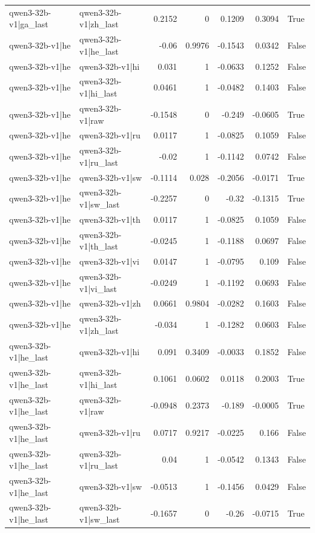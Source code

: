 \begin{table}
\begin{tabular}{l l r r r r l}
qwen3-32b-v1|ga_last & qwen3-32b-v1|zh_last & 0.2152 & 0 & 0.1209 & 0.3094 & True \\
qwen3-32b-v1|he & qwen3-32b-v1|he_last & -0.06 & 0.9976 & -0.1543 & 0.0342 & False \\
qwen3-32b-v1|he & qwen3-32b-v1|hi & 0.031 & 1 & -0.0633 & 0.1252 & False \\
qwen3-32b-v1|he & qwen3-32b-v1|hi_last & 0.0461 & 1 & -0.0482 & 0.1403 & False \\
qwen3-32b-v1|he & qwen3-32b-v1|raw & -0.1548 & 0 & -0.249 & -0.0605 & True \\
qwen3-32b-v1|he & qwen3-32b-v1|ru & 0.0117 & 1 & -0.0825 & 0.1059 & False \\
qwen3-32b-v1|he & qwen3-32b-v1|ru_last & -0.02 & 1 & -0.1142 & 0.0742 & False \\
qwen3-32b-v1|he & qwen3-32b-v1|sw & -0.1114 & 0.028 & -0.2056 & -0.0171 & True \\
qwen3-32b-v1|he & qwen3-32b-v1|sw_last & -0.2257 & 0 & -0.32 & -0.1315 & True \\
qwen3-32b-v1|he & qwen3-32b-v1|th & 0.0117 & 1 & -0.0825 & 0.1059 & False \\
qwen3-32b-v1|he & qwen3-32b-v1|th_last & -0.0245 & 1 & -0.1188 & 0.0697 & False \\
qwen3-32b-v1|he & qwen3-32b-v1|vi & 0.0147 & 1 & -0.0795 & 0.109 & False \\
qwen3-32b-v1|he & qwen3-32b-v1|vi_last & -0.0249 & 1 & -0.1192 & 0.0693 & False \\
qwen3-32b-v1|he & qwen3-32b-v1|zh & 0.0661 & 0.9804 & -0.0282 & 0.1603 & False \\
qwen3-32b-v1|he & qwen3-32b-v1|zh_last & -0.034 & 1 & -0.1282 & 0.0603 & False \\
qwen3-32b-v1|he_last & qwen3-32b-v1|hi & 0.091 & 0.3409 & -0.0033 & 0.1852 & False \\
qwen3-32b-v1|he_last & qwen3-32b-v1|hi_last & 0.1061 & 0.0602 & 0.0118 & 0.2003 & True \\
qwen3-32b-v1|he_last & qwen3-32b-v1|raw & -0.0948 & 0.2373 & -0.189 & -0.0005 & True \\
qwen3-32b-v1|he_last & qwen3-32b-v1|ru & 0.0717 & 0.9217 & -0.0225 & 0.166 & False \\
qwen3-32b-v1|he_last & qwen3-32b-v1|ru_last & 0.04 & 1 & -0.0542 & 0.1343 & False \\
qwen3-32b-v1|he_last & qwen3-32b-v1|sw & -0.0513 & 1 & -0.1456 & 0.0429 & False \\
qwen3-32b-v1|he_last & qwen3-32b-v1|sw_last & -0.1657 & 0 & -0.26 & -0.0715 & True \\

\end{tabular}
\end{table}
